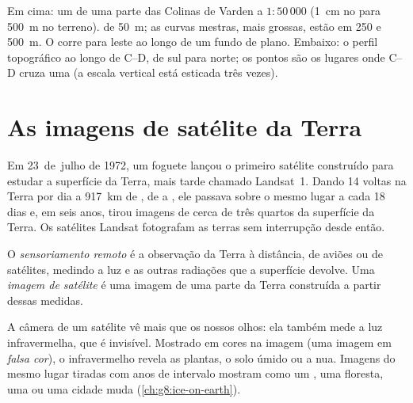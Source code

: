 \begin{omfigure}
{\small Em cima: um  de uma parte das Colinas de Varden a
$1 : 50\,000$ (1~cm no  para \qty{500}{m} no terreno). 
de \qty{50}{m}; as curvas mestras, mais grossas, estão em 250 e
\qty{500}{m}. O  corre para leste ao longo de um fundo de  plano.
Embaixo: o perfil topográfico ao longo de C--D, de sul para norte; os
pontos são os lugares onde C--D cruza uma  (a escala
vertical está esticada três vezes).}
\label{fig:g9:maps-of-the-earth:topo}
\end{omfigure}

\section{As imagens de satélite da Terra}

Em 23~de~julho de 1972, um foguete lançou o primeiro satélite construído
para estudar a superfície da Terra, mais tarde chamado Landsat~1. Dando
14 voltas na Terra por dia a \qty{917}{km} de , de  a ,
ele passava sobre o mesmo lugar a cada 18 dias e, em seis anos, tirou
imagens de cerca de três quartos da superfície da Terra. Os satélites
Landsat fotografam as terras sem interrupção desde então.

\begin{definition}\label{def:g9:maps-of-the-earth:remote-sensing}
O \emph{sensoriamento remoto} é a observação
da Terra à distância, de aviões ou de satélites, medindo a luz e as
outras radiações que a superfície devolve. Uma \emph{imagem de
satélite} é uma imagem de
uma parte da Terra construída a partir dessas medidas.
\end{definition}

A câmera de um satélite vê mais que os nossos olhos: ela também mede a luz
infravermelha, que é invisível. Mostrado em cores na imagem (uma imagem em
\emph{falsa cor}), o infravermelho revela as plantas, o solo úmido ou a
 nua. Imagens do mesmo lugar tiradas com anos de intervalo mostram
como um , uma floresta, uma  ou uma cidade muda
(\cref{ch:g8:ice-on-earth}).


